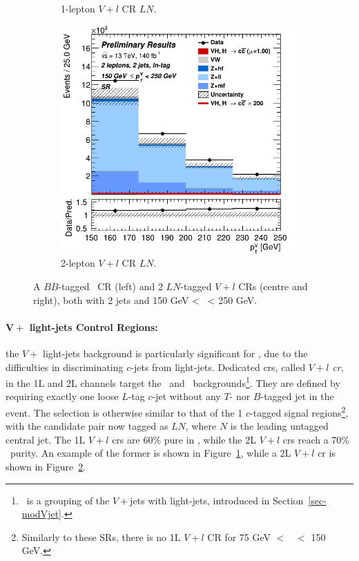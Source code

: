 \begin{figure}[h!]
\begin{subfigure}[b]{0.32\textwidth}
      \caption{1-lepton $V+l$ CR $LN$.}
      \label{fig:plots_VHcc_ex_1L_CRvl}
  \end{subfigure}
  \begin{subfigure}[b]{0.32\textwidth}
    \centering
    \includegraphics[width=\textwidth]{Images/VH/Own_fit/prefit_VHcc/Region_distpTV_BMax250_BMin150_DSR_J2_TTypeln_T1_L2_Y6051_Prefit.png}
    \caption{2-lepton $V+l$ CR $LN$.}
    \label{fig:plots_VHcc_ex_2L_CRvl}
\end{subfigure}
  \caption{A $BB$-tagged \lowdr\ CR (left) and 2 $LN$-tagged $V+l$ CRs (centre and right), both with 2 jets and 150 GeV < \ptv\ < 250 GeV.}
  \label{fig:plots_VH_ex_CRL_CRvl}
\end{figure} 

\paragraph{$\boldsymbol{V +}$ light-jets Control Regions:} the $V +$ light-jets background is particularly significant for \vhc, due to the difficulties in discriminating $c$-jets from light-jets. Dedicated \glspl{cr}, called \textit{$V+l$ \gls{cr}}, in the 1L and 2L channels target the \wlf\ and \zlf\ backgrounds\footnote{\vlf\ is a grouping of the $V+$jets with light-jets, introduced in Section~\ref{sec-modVjet}.}. They are defined by requiring exactly one loose $L$-tag $c$-jet without any $T$- nor $B$-tagged jet in the event. The selection is otherwise similar to that of the 1 $c$-tagged signal regions\footnote{Similarly to these SRs, there is no 1L $V+l$ CR for 75 GeV $<$ \ptv\ $<$ 150 GeV.}, with the candidate pair now tagged as $LN$, where $N$ is the leading untagged central jet. The 1L $V+l$ \glspl{cr} are 60\% pure in \wlf, while the 2L $V+l$ \glspl{cr} reach a 70\% \zlf\ purity. An example of the former is shown in Figure~\ref{fig:plots_VHcc_ex_1L_CRvl}, while a 2L $V+l$ \gls{cr} is shown in Figure~\ref{fig:plots_VHcc_ex_2L_CRvl}. 

